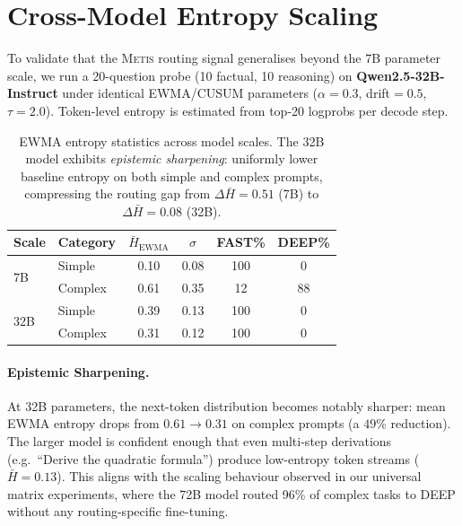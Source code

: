 \documentclass[11pt,a4paper]{article}
\newcommand{\metis}{\textsc{Metis}}
\begin{document}
\appendix
\section{Cross-Model Entropy Scaling}
\label{app:scaling}

To validate that the \metis{} routing signal generalises beyond the 7B parameter scale, we run a 20-question probe (10 factual, 10 reasoning) on \textbf{Qwen2.5-32B-Instruct} under identical EWMA/CUSUM parameters ($\alpha{=}0.3$, drift${=}0.5$, $\tau{=}2.0$). Token-level entropy is estimated from top-20 logprobs per decode step.

\begin{table}[ht]
\centering
\caption{EWMA entropy statistics across model scales. The 32B model exhibits \emph{epistemic sharpening}: uniformly lower baseline entropy on both simple and complex prompts, compressing the routing gap from $\Delta\bar{H}=0.51$ (7B) to $\Delta\bar{H}=0.08$ (32B).}
\label{tab:scaling}
\small
\begin{tabular}{@{}llcccc@{}}
\toprule
\textbf{Scale} & \textbf{Category} & \textbf{$\bar{H}_{\text{EWMA}}$} & \textbf{$\sigma$} & \textbf{FAST\%} & \textbf{DEEP\%} \\
\midrule
\multirow{2}{*}{7B}  & Simple  & 0.10 & 0.08 & 100 & 0 \\
                      & Complex & 0.61 & 0.35 & 12  & 88 \\
\midrule
\multirow{2}{*}{32B} & Simple  & 0.39 & 0.13 & 100 & 0 \\
                      & Complex & 0.31 & 0.12 & 100 & 0 \\
\bottomrule
\end{tabular}
\end{table}

\paragraph{Epistemic Sharpening.}
At 32B parameters, the next-token distribution becomes notably sharper: mean EWMA entropy drops from $0.61 \to 0.31$ on complex prompts (a $49\%$ reduction). The larger model is confident enough that even multi-step derivations (e.g.\ ``Derive the quadratic formula'') produce low-entropy token streams ($\bar{H}=0.13$). This aligns with the scaling behaviour observed in our universal matrix experiments, where the 72B model routed 96\% of complex tasks to DEEP without any routing-specific fine-tuning.
\end{document}
